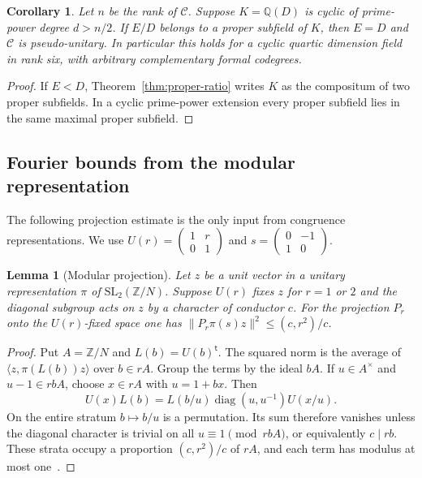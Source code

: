 \documentclass[11pt,reqno]{amsart}
\newtheorem{lemma}[theorem]{Lemma}
\newtheorem{corollary}[theorem]{Corollary}
\theoremstyle{remark}\newtheorem{remark}[theorem]{Remark}
\numberwithin{equation}{section}
\begin{document}
\begin{corollary}\label{cor:cyclic-prime-power-proper-ratio}
Let $n$ be the rank of $\mathcal C$. Suppose $K=\mathbb Q(D)$ is cyclic of prime-power degree $d>n/2$. If $E/D$ belongs to a proper subfield of $K$, then
$E=D$ and $\mathcal C$ is pseudo-unitary.
In particular this holds for a cyclic quartic dimension field in
rank six, with arbitrary complementary formal codegrees.
\end{corollary}
\begin{proof}
If $E<D$, Theorem~\ref{thm:proper-ratio} writes $K$ as the compositum
of two proper subfields. In a cyclic prime-power extension every
proper subfield lies in the same maximal proper subfield.
\end{proof}

\subsection{Fourier bounds from the modular representation}
The following projection estimate is the only input from congruence
representations. We use $U(r)=\left(\begin{smallmatrix}1&r\\0&1\end{smallmatrix}\right)$
and $s=\left(\begin{smallmatrix}0&-1\\1&0\end{smallmatrix}\right)$.

\begin{lemma}[Modular projection]\label{lem:mass-fourier-verification}
Let $z$ be a unit vector in a unitary representation $\pi$ of
$\mathrm{SL}_2(\mathbb Z/N)$. Suppose $U(r)$ fixes $z$ for $r=1$
or $2$ and the diagonal subgroup acts on $z$ by a character of
conductor $c$. For the projection $P_r$ onto the $U(r)$-fixed
space one has $\|P_r\pi(s)z\|^2\le(c,r^2)/c$.
\end{lemma}
\begin{proof}
Put $A=\mathbb Z/N$ and $L(b)=U(b)^{\mathsf t}$. The squared norm is
the average of $\langle z,\pi(L(b))z\rangle$ over $b\in rA$.
Group the terms by the ideal $bA$. If $u\in A^\times$ and
$u-1\in rbA$, choose $x\in rA$ with $u=1+bx$. Then
\[
 U(x)L(b)=L(b/u)\operatorname{diag}(u,u^{-1})U(x/u).
\]
On the entire stratum $b\mapsto b/u$ is a permutation. Its sum
therefore vanishes unless the diagonal character is trivial on all
$u\equiv1\pmod{rbA}$, or equivalently $c\mid rb$. These strata
occupy a proportion $(c,r^2)/c$ of $rA$, and each term has modulus
at most one~\cite[Lemma~4.1 and Proposition~4.3]{Class6Rank5}.
\end{proof}
\end{document}
